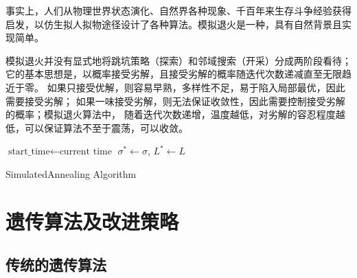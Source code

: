 \documentclass[12pt]{ctexart}
\begin{document}
事实上，人们从物理世界状态演化、自然界各种现象、千百年来生存斗争经验获得启发，以仿生拟人拟物途径设计了各种算法。模拟退火是一种，具有自然背景且实现简单。

模拟退火并没有显式地将跳坑策略（探索）和邻域搜索（开采）分成两阶段看待；它的基本思想是，以概率接受劣解，且接受劣解的概率随迭代次数递减直至无限趋近于零。
如果只接受优解，则容易早熟，多样性不足，易于陷入局部最优，因此需要接受劣解；
如果一味接受劣解，则无法保证收敛性，因此需要控制接受劣解的概率；模拟退火算法中，
随着迭代次数递增，温度越低，对劣解的容忍程度越低，可以保证算法不至于震荡，可以收敛。

\IncMargin{1em}
\begin{algorithm}[H]
    \BlankLine
    $\text{start\_time} \leftarrow \text{current time}$\;
    $\sigma^* \leftarrow \sigma$, $L^* \leftarrow L$\;
    \caption{SimulatedAnnealing Algorithm}
\end{algorithm}
\DecMargin{1em}

\section{遗传算法及改进策略}

\subsection{传统的遗传算法}

\end{document}
